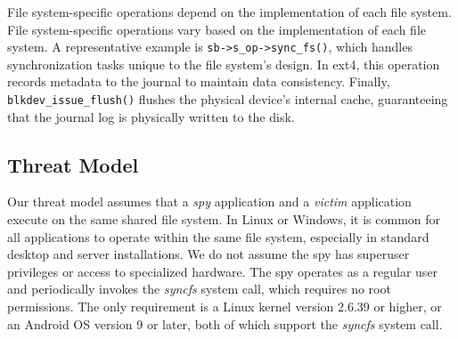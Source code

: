 File system-specific operations depend on the implementation of each file system. File system-specific operations vary based on the implementation of each file system. A representative example is \texttt{sb->s\_op->sync\_fs()}, which handles synchronization tasks unique to the file system's design. In ext4, this operation records metadata to the journal to maintain data consistency. Finally, \texttt{blkdev\_issue\_flush()} flushes the physical device's internal cache, guaranteeing that the journal log is physically written to the disk.







\subsection{Threat Model}
\label{sec:threatmodel}



Our threat model assumes that a \textit{spy} application and a \textit{victim} application execute on the same shared file system. In Linux or Windows, it is common for all applications to operate within the same file system, especially in standard desktop and server installations. We do not assume the spy has superuser privileges or access to specialized hardware. The spy operates as a regular user and periodically invokes the \textit{syncfs} system call, which requires no root permissions. The only requirement is a Linux kernel version 2.6.39 or higher, or an Android OS version 9 or later, both of which support the \textit{syncfs} system call.



